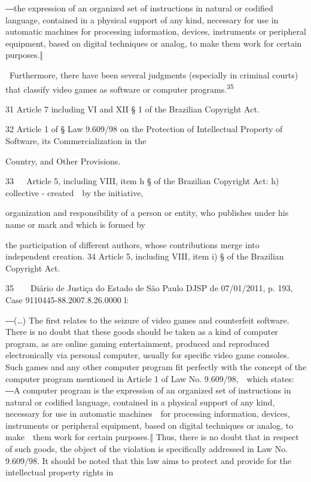 \documentclass[
]{article}
\begin{document}
{―the expression of an organized set of instructions in natural or
codified language, }{contained in a physical support of any kind,
necessary for use in automatic machines for processing information,
devices, instruments or peripheral equipment, based on digital
}{techniques or analog, to make them work for certain purposes.‖}

{~Furthermore, there have been several judgments (especially in criminal
courts) that classify video games as software or computer
programs.}\textsuperscript{{35}}

{31 }{Article 7 including VI and XII § 1 of the Brazilian }{Copyright
Act}{.}

{32 }{Article 1 of § Law 9.609/98 on the Protection of Intellectual
Property of Software, its Commercialization in the}

{Country, and Other Provisions.}

{33}{~~~}{Article 5, including VIII, item h § of the Brazilian
}{Copyright Act}{: h) collective - }{created~~by the initiative,}

{organization and responsibility of a person or entity, who publishes
under his name or mark and which is formed by}

{the participation of different authors, whose contributions merge into
independent creation}{. }{34 }{Article 5, including VIII, item i) § of
the Brazilian }{Copyright Act}{.}

{35}{~~~~}{Diário de Justiça do Estado de São Paulo DJSP de 07/01/2011,
p. 193, Case 9110445-88.2007.8.26.0000 l:}

{―(\ldots) }{The first relates to the seizure of video games and
counterfeit software. There is no doubt that these goods should be taken
as a kind of computer program, as are online gaming entertainment,
produced and reproduced electronically via personal computer, usually
for specific video game consoles. Such games and any other computer
program fit perfectly with the concept of the computer program mentioned
in Article 1 of Law No. 9.609/98,~~which states: }{―}{A computer program
is the expression of an organized set of instructions in natural or
codified language, contained in a physical support of any kind,
necessary for use in automatic machines~~for processing information,
devices, instruments or peripheral equipment, based on digital
techniques or analog, to make~~them work for certain purposes}{.‖
Thus}{, there is no doubt that in respect of such goods, the object of
the violation is specifically addressed in Law No. 9.609/98. It should
be noted that this law aims to protect and provide for the intellectual
property rights in}
\end{document}
